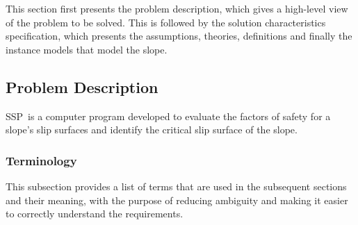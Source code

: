 \documentclass[12pt]{article}
\newcommand{\progname}{SSP}
\begin{document}
This section first presents the problem description, which gives a
high-level view of the problem to be solved.  This is followed by the
solution characteristics specification, which presents the
assumptions, theories, definitions and finally the instance models
that model the slope. \\

\subsection{Problem Description} \label{Sec_pd}

\progname\ is a computer program developed to evaluate the factors of safety 
for a slope's slip surfaces and identify the critical slip surface of the slope.

\subsubsection{Terminology}

This subsection provides a list of terms that are used in the subsequent
sections and their meaning, with the purpose of reducing ambiguity and
 making it easier to correctly understand the requirements.
\end{document}
